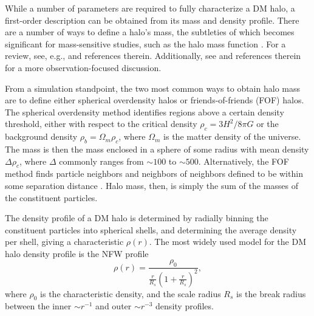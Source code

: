 

While a number of parameters are required to fully characterize a DM halo, a first-order description can be obtained from its mass and density profile.  There are a number of ways to define a halo's mass, the subtleties of which becomes significant for mass-sensitive studies, such as the halo mass function \citep{1974ApJ...187..425P, 2007MNRAS.374....2R, 2006ApJ...642L..85H, 2007ApJ...671.1160L}.  For a review, see, e.g., \citet{2001A&A...367...27W} and references therein.  Additionally, see \citet{2005RvMP...77..207V} and references therein for a more observation-focused discussion.

From a simulation standpoint, the two most common ways to obtain halo mass are to define either spherical overdensity halos or friends-of-friends (FOF) halos.  The spherical overdensity method identifies regions above a certain density threshold, either with respect to the critical density $\rho_{c} = 3 H^{2} / 8 \pi G$ or the background density $\rho_{b} = \Omega_{m} \rho_{c}$, where $\Omega_{m}$ is the matter density of the universe.  The mass is then the mass enclosed in a sphere of some radius with mean density $\Delta \rho_{c}$, where $\Delta$ commonly ranges from $\sim 100$ to $\sim 500$.  Alternatively, the FOF method finds particle neighbors and neighbors of neighbors defined to be within some separation distance \citep{1984MNRAS.206..529E, 1985ApJ...292..371D}.  Halo mass, then, is simply the sum of the masses of the constituent particles.

The density profile of a DM halo is determined by radially binning the constituent particles into spherical shells, and determining the average density per shell, giving a characteristic $\rho(r)$.  The most widely used model for the DM halo density profile is the NFW \citep{1996ApJ...462..563N} profile
\begin{equation} \label{eq:nfw_profile}
	\rho(r) = \frac{ \rho_{0} }{ \frac{ r }{ R_{s}} \left( 1 + \frac{r}{R_{s}} \right)^{2} },
\end{equation}
where $\rho_{0}$ is the characteristic density, and the scale radius $R_{s}$ is the break radius between the inner $\sim r^{-1}$ and outer $\sim r^{-3}$ density profiles.

